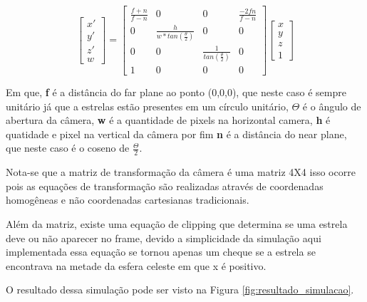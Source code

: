\begin{equation}
    \begin{bmatrix}
        x' \\
        y' \\
        z' \\
        w
    \end{bmatrix}
    =
    \begin{bmatrix}
        \frac{f+n}{f-n} & 0                                 & 0                               & \frac{-2fn}{f-n} \\
        0               & \frac{h}{w*tan(\frac{\theta}{2})} & 0                               & 0                \\
        0               & 0                                 & \frac{1}{tan(\frac{\theta}{2})} & 0                \\
        1               & 0                                 & 0                               & 0
    \end{bmatrix}
    \begin{bmatrix}
        x \\
        y \\
        z \\
        1
    \end{bmatrix}
\end{equation}

Em que, \textbf{f} é a distância do far plane ao ponto (0,0,0), que neste caso é sempre unitário já que a estrelas estão presentes em um círculo unitário, $\Theta$ é o ângulo de abertura  da câmera, \textbf{w} é a quantidade de pixels na horizontal camera, \textbf{h} é quatidade e pixel na vertical da câmera por fim \textbf{n} é a distância do near plane, que neste caso é o coseno de $\frac{\Theta}{2}$.

Nota-se que a matriz de transformação da câmera é uma matriz 4X4 isso ocorre pois as equações de transformação são realizadas através de coordenadas homogêneas e não coordenadas cartesianas tradicionais.

Além da matriz, existe uma equação de clipping que determina se uma estrela deve ou não aparecer no frame, devido a simplicidade da simulação aqui implementada essa equação se tornou apenas um cheque se a estrela se encontrava na metade da esfera celeste em que x é positivo.

O resultado dessa simulação pode ser visto na Figura \ref{fig:resultado_simulacao}.

